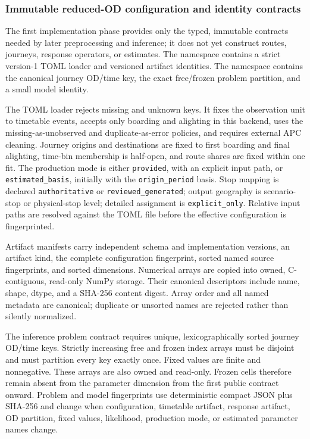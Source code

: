 \subsubsection{Immutable reduced-OD configuration and identity contracts}
\label{sec:reduced-od-phase-one-contracts}

The first implementation phase provides only the typed, immutable contracts
needed by later preprocessing and inference; it does not yet construct routes,
journeys, response operators, or estimates.  The namespace
 contains a strict
version-1 TOML loader and versioned artifact identities.  The namespace
 contains the canonical
journey OD/time key, the exact free/frozen problem partition, and a small model
identity.

The TOML loader rejects missing and unknown keys.  It fixes the observation
unit to timetable events, accepts only boarding and alighting in this backend,
uses the missing-as-unobserved and duplicate-as-error policies, and requires
external APC cleaning.  Journey origins and destinations are fixed to first
boarding and final alighting, time-bin membership is half-open, and route
shares are fixed within one fit.  The production mode is either
\texttt{provided}, with an explicit input path, or
\texttt{estimated\_basis}, initially with the
\texttt{origin\_period} basis.  Stop mapping is declared
\texttt{authoritative} or \texttt{reviewed\_generated}; output geography is
scenario-stop or physical-stop level; detailed assignment is
\texttt{explicit\_only}.  Relative input paths are resolved against the TOML
file before the effective configuration is fingerprinted.

Artifact manifests carry independent schema and implementation versions, an
artifact kind, the complete configuration fingerprint, sorted named source
fingerprints, and sorted dimensions.  Numerical arrays are copied into owned,
C-contiguous, read-only NumPy storage.  Their canonical descriptors include
name, shape, dtype, and a SHA-256 content digest.  Array order and all named
metadata are canonical; duplicate or unsorted names are rejected rather than
silently normalized.

The inference problem contract requires unique, lexicographically sorted
journey OD/time keys.  Strictly increasing free and frozen index arrays must be
disjoint and must partition every key exactly once.  Fixed values are finite
and nonnegative.  These arrays are also owned and read-only.  Frozen cells
therefore remain absent from the parameter dimension from the first public
contract onward.  Problem and model fingerprints use deterministic compact
JSON plus SHA-256 and change when configuration, timetable artifact, response
artifact, OD partition, fixed values, likelihood, production mode, or estimated
parameter names change.

